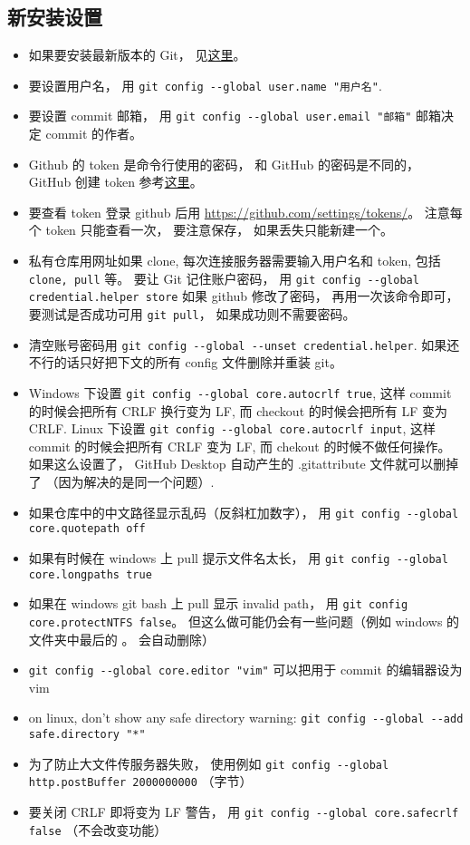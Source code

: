 \subsection{新安装设置}
\begin{itemize}
\item 如果要安装最新版本的 Git， 见\href{https://git-scm.com/downloads}{这里}。
\item 要设置用户名， 用 \verb|git config --global user.name "用户名"|.
\item 要设置 commit 邮箱， 用 \verb|git config --global user.email "邮箱"|  邮箱决定 commit 的作者。
\item Github 的 token 是命令行使用的密码， 和 GitHub 的密码是不同的， GitHub 创建 token 参考\href{https://docs.github.com/en/github/authenticating-to-github/keeping-your-account-and-data-secure/creating-a-personal-access-token#creating-a-token}{这里}。
\item 要查看 token 登录 github 后用 \href{https://github.com/settings/tokens/}{https://github.com/settings/tokens/}。 注意每个 token 只能查看一次， 要注意保存， 如果丢失只能新建一个。
\item 私有仓库用网址如果 clone, 每次连接服务器需要输入用户名和 token, 包括 \verb|clone, pull| 等。 要让 Git 记住账户密码， 用 \verb|git config --global credential.helper store| 如果 github 修改了密码， 再用一次该命令即可， 要测试是否成功可用 \verb|git pull|， 如果成功则不需要密码。
\item 清空账号密码用 \verb|git config --global --unset credential.helper|. 如果还不行的话只好把下文的所有 config 文件删除并重装 git。
\item Windows 下设置 \verb|git config --global core.autocrlf true|, 这样 commit 的时候会把所有 CRLF 换行变为 LF, 而 checkout 的时候会把所有 LF 变为 CRLF. Linux 下设置 \verb|git config --global core.autocrlf input|, 这样 commit 的时候会把所有 CRLF 变为 LF, 而 chekout 的时候不做任何操作。 如果这么设置了， GitHub Desktop 自动产生的 .gitattribute 文件就可以删掉了 （因为解决的是同一个问题）.
\item 如果仓库中的中文路径显示乱码（反斜杠加数字）， 用 \verb|git config --global core.quotepath off|
\item 如果有时候在 windows 上 pull 提示文件名太长， 用 \verb|git config --global core.longpaths true|
\item 如果在 windows git bash 上 pull 显示 invalid path， 用 \verb|git config core.protectNTFS false|。 但这么做可能仍会有一些问题（例如 windows 的文件夹中最后的 。 会自动删除）
\item \verb|git config --global core.editor "vim"| 可以把用于 commit 的编辑器设为 vim
\item on linux, don't show any safe directory warning: \verb|git config --global --add safe.directory "*"|
\item 为了防止大文件传服务器失败， 使用例如 \verb|git config --global http.postBuffer 2000000000| （字节）
\item 要关闭 CRLF 即将变为 LF 警告， 用 \verb|git config --global core.safecrlf false| （不会改变功能）
\end{itemize}


